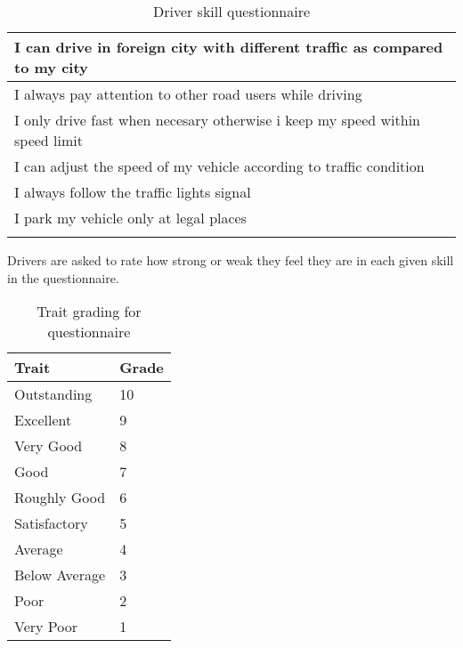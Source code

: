 \documentclass[12pt,letterpaper]{report}
\begin{document}
\begin{longtable}{|l|}
I can drive in foreign city with different traffic as compared to my city                                                                                                                                         \\ \hline
I always pay attention to other road users while driving                                                                                                                                                          \\ \hline
I only drive fast when necesary otherwise i keep my speed within speed limit                                                                                                                                      \\ \hline
I can adjust the speed of my vehicle according to traffic condition                                                                                                                                               \\ \hline
I always follow the traffic lights signal                                                                                                                                                                         \\ \hline
I park my vehicle only at legal places                                                                                                                                                                            \\ \hline
\caption{Driver skill questionnaire}
\label{tab:my-table}\\
\end{longtable}

Drivers are asked to rate how strong or weak they feel they are in each given skill in the questionnaire.

\begin{table}[H]
\centering
\begin{tabular}{|l|l|}
\hline
\textbf{Trait} & \textbf{Grade} \\ \hline
Outstanding    & 10             \\ \hline
Excellent      & 9              \\ \hline
Very Good      & 8              \\ \hline
Good           & 7              \\ \hline
Roughly Good   & 6              \\ \hline
Satisfactory   & 5              \\ \hline
Average        & 4              \\ \hline
Below Average  & 3              \\ \hline
Poor           & 2              \\ \hline
Very Poor      & 1              \\ \hline
\end{tabular}
\caption{Trait grading for questionnaire}
\end{table}

\newpage
\printbibliography
\end{document}
